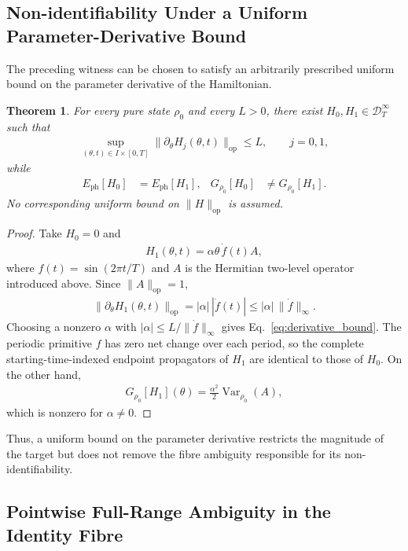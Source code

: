 \documentclass[twocolumn,prl,aps,floatfix]{revtex4-2}
\newtheorem{theorem}{Theorem}
\begin{document}
\subsection{Non-identifiability Under a Uniform Parameter-Derivative Bound}

The preceding witness can be chosen to satisfy an arbitrarily prescribed uniform bound on the parameter derivative of the Hamiltonian.

\begin{theorem}
For every pure state $\rho_0$ and every $L>0$, there exist
$H_0,H_1\in\mathcal D_T^\infty$ such that
\begin{align}
\sup_{(\theta,t)\in I\times[0,T]}
\|\partial_\theta H_j(\theta,t)\|_{\mathrm{op}}
\le L,
\qquad j=0,1,
\label{eq:derivative_bound}
\end{align}
while
\begin{align}
E_{\mathrm{ph}}[H_0]&=E_{\mathrm{ph}}[H_1],
&
G_{\rho_0}[H_0]&\ne G_{\rho_0}[H_1].
\end{align}
No corresponding uniform bound on $\|H\|_{\mathrm{op}}$ is assumed.
\end{theorem}

\begin{proof}
Take $H_0=0$ and
\begin{align}
H_1(\theta,t)
=
\alpha\theta\,\dot f(t)A,
\end{align}
where $f(t)=\sin(2\pi t/T)$ and $A$ is the Hermitian two-level operator introduced above. Since
$\|A\|_{\mathrm{op}}=1$,
\begin{align}
\|\partial_\theta H_1(\theta,t)\|_{\mathrm{op}}
=
|\alpha|\,|\dot f(t)|
\le
|\alpha|\,\|\dot f\|_{\infty}.
\end{align}
Choosing a nonzero $\alpha$ with
$|\alpha|\le L/\|\dot f\|_{\infty}$ gives Eq.~\eqref{eq:derivative_bound}. The periodic primitive $f$ has zero net change over each period, so the complete starting-time-indexed endpoint propagators of $H_1$ are identical to those of $H_0$. On the other hand,
\begin{align}
G_{\rho_0}[H_1](\theta)
=
\frac{\alpha^2}{2}
\operatorname{Var}_{\rho_0}(A),
\end{align}
which is nonzero for $\alpha\ne0$.
\end{proof}

Thus, a uniform bound on the parameter derivative restricts the magnitude of the target but does not remove the fibre ambiguity responsible for its non-identifiability.

\subsection{Pointwise Full-Range Ambiguity in the Identity Fibre}
\end{document}
